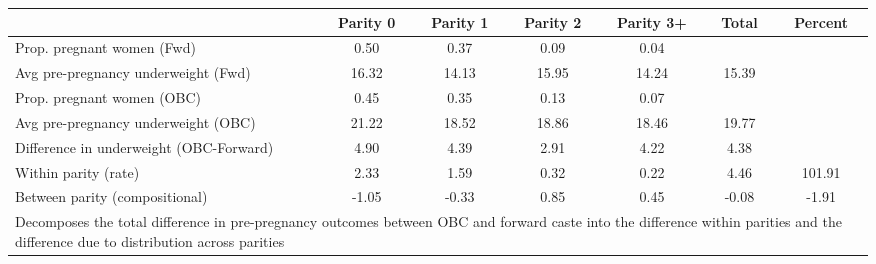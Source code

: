 \begin{tabular}{l*{6}{c}}
\toprule
            &\multicolumn{1}{c}{Parity 0}&\multicolumn{1}{c}{Parity 1}&\multicolumn{1}{c}{Parity 2}&\multicolumn{1}{c}{Parity 3+}&\multicolumn{1}{c}{Total}&\multicolumn{1}{c}{Percent}\\
\midrule
\midrule
Prop. pregnant women (Fwd)&        0.50&        0.37&        0.09&        0.04&            &            \\
Avg pre-pregnancy underweight (Fwd)&       16.32&       14.13&       15.95&       14.24&       15.39&            \\
Prop. pregnant women (OBC)&        0.45&        0.35&        0.13&        0.07&            &            \\
Avg pre-pregnancy underweight (OBC)&       21.22&       18.52&       18.86&       18.46&       19.77&            \\
Difference in underweight (OBC-Forward)&        4.90&        4.39&        2.91&        4.22&        4.38&            \\
Within parity (rate)&        2.33&        1.59&        0.32&        0.22&        4.46&      101.91\\
Between parity (compositional)&       -1.05&       -0.33&        0.85&        0.45&       -0.08&       -1.91\\
\bottomrule
\multicolumn{7}{l}{\footnotesize Decomposes the total difference in pre-pregnancy outcomes between OBC and forward caste into the difference within parities and the difference due to distribution across parities}\\
\end{tabular}
